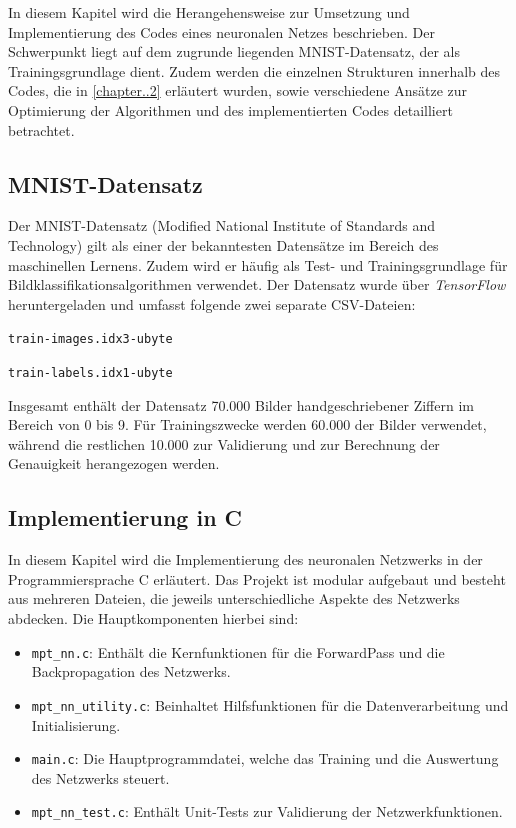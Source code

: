 \documentclass[a4paper, 12pt]{article}
\begin{document}
In diesem Kapitel wird die Herangehensweise zur Umsetzung und Implementierung des Codes eines 
neuronalen Netzes beschrieben. Der Schwerpunkt liegt auf dem zugrunde liegenden MNIST-Datensatz, 
der als Trainingsgrundlage dient. Zudem werden die einzelnen Strukturen innerhalb des Codes, die 
in \autoref{chapter..2} erläutert wurden, sowie verschiedene Ansätze zur Optimierung der 
Algorithmen und des implementierten Codes detailliert betrachtet.

\subsection{MNIST-Datensatz}\label{chapter..3.1}

Der MNIST-Datensatz (Modified National Institute of Standards and Technology) gilt als einer der 
bekanntesten Datensätze im Bereich des maschinellen Lernens. Zudem wird er häufig als Test- und 
Trainingsgrundlage für Bildklassifikationsalgorithmen verwendet. Der Datensatz wurde über 
\textit{TensorFlow} heruntergeladen und umfasst folgende zwei separate CSV-Dateien:

\begin{center}
	\texttt{train-images.idx3-ubyte}
\end{center}

\begin{center}
	\texttt{train-labels.idx1-ubyte}
\end{center}

Insgesamt enthält der Datensatz 70.000 Bilder handgeschriebener Ziffern im Bereich von 0 bis 9. 
Für Trainingszwecke werden 60.000 der Bilder verwendet, während die restlichen 10.000 zur 
Validierung und zur Berechnung der Genauigkeit herangezogen werden.

\newpage %

\subsection{Implementierung in C}\label{sec:implementierung}

In diesem Kapitel wird die Implementierung des neuronalen Netzwerks in der Programmiersprache C erläutert. 
Das Projekt ist modular aufgebaut und besteht aus mehreren Dateien, die jeweils unterschiedliche Aspekte des Netzwerks abdecken. 
Die Hauptkomponenten hierbei sind:

\begin{itemize}
    \item \texttt{mpt\_nn.c}: Enthält die Kernfunktionen für die ForwardPass und die Backpropagation des Netzwerks.
    \item \texttt{mpt\_nn\_utility.c}: Beinhaltet Hilfsfunktionen für die Datenverarbeitung und Initialisierung.
    \item \texttt{main.c}: Die Hauptprogrammdatei, welche das Training und die Auswertung des Netzwerks steuert.
    \item \texttt{mpt\_nn\_test.c}: Enthält Unit-Tests zur Validierung der Netzwerkfunktionen.
\end{itemize}
\end{document}
